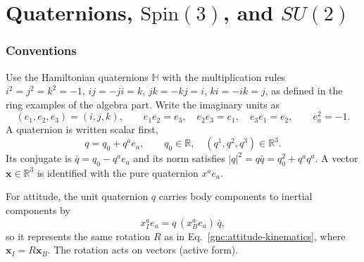 \part{Quaternions, \texorpdfstring{$\mathrm{Spin}(3)$}{Spin(3)}, and \texorpdfstring{$SU(2)$}{SU(2)}}
\section{Conventions}
Use the Hamiltonian quaternions $\mathbb H$ with the multiplication rules
$i^2=j^2=k^2=-1$, $ij=-ji=k$, $jk=-kj=i$, $ki=-ik=j$, as defined in
the ring examples of the algebra part. Write the imaginary units as
\begin{equation}\label{quat:basis}
 (e_1,e_2,e_3)=(i,j,k),\qquad e_1e_2=e_3,\quad e_2e_3=e_1,\quad e_3e_1=e_2,
 \qquad e_a^2=-1 .
\end{equation}
A quaternion is written scalar first,
\begin{equation}\label{quat:scalar-first}
 q=q_0+q^ae_a,\qquad q_0\in\mathbb R,\quad (q^1,q^2,q^3)\in\mathbb R^3 .
\end{equation}
Its conjugate is $\bar q=q_0-q^ae_a$ and its norm satisfies
$|q|^2=q\bar q=q_0^2+q^aq^a$. A vector $\mathbf x\in\mathbb R^3$ is
identified with the pure quaternion $x^ae_a$.

For attitude, the unit quaternion $q$ carries body components to inertial
components by
\begin{equation}\label{quat:body-to-inertial}
 x_I^ae_a=q\,(x_B^ae_a)\,\bar q ,
\end{equation}
so it represents the same rotation $R$ as in Eq.~\eqref{gnc:attitude-kinematics},
where $\mathbf x_I=R\mathbf x_B$. The rotation acts on vectors (active form).

